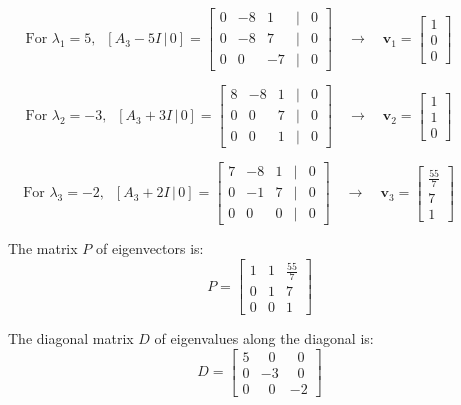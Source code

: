 \documentclass[a4paper,11pt,reqno]{amsart}
\numberwithin{equation}{section}
\begin{document}
\begin{enumerate}
\begin{center}
{{     \[ \text{For } \lambda_1 = 5, \;\;
     [A_3 - 5I\,|\,0] = \begin{bmatrix} 0 & -8 & 1 & | & 0 \\ 0 & -8 & 7 & | & 0 \\ 0 & 0 & -7 & | & 0 \end{bmatrix}
     \quad \to \quad
     \mathbf{v}_1 = \begin{bmatrix} 1 \\ 0 \\ 0 \end{bmatrix} \quad\quad\quad
     \]

   
     \[ \text{For } \lambda_2 = -3, \;\;
     [A_3 + 3I \,|\, 0] = \begin{bmatrix} 8 & -8 & 1 & | & 0 \\ 0 & 0 & 7 & | & 0 \\ 0 & 0 & 1 & | & 0 \end{bmatrix}
     \quad \to \quad
     \mathbf{v}_2 = \begin{bmatrix} 1 \\ 1 \\ 0 \end{bmatrix} \quad\quad\quad
     \]

     \[\text{For } \lambda_3 = -2, \;\;
     [A_3 + 2I \,|\, 0] = \begin{bmatrix} 7 & -8 & 1 & | & 0 \\ 0 & -1 & 7 & | & 0 \\ 0 & 0 & 0 & | & 0 \end{bmatrix}
     \quad \to \quad
     \mathbf{v}_3 = \begin{bmatrix} \frac{55}{7} \\ 7 \\ 1 \end{bmatrix} \quad\quad\quad
     \]

   The matrix \( P \) of eigenvectors is:
   \[
   P = \begin{bmatrix} 
   1 & 1 & \frac{55}{7} \\ 
   0 & 1 & 7 \\ 
   0 & 0 & 1
   \end{bmatrix}
   \]

   The diagonal matrix \( D \) of eigenvalues along the diagonal is:
   \[
   D = \begin{bmatrix} 
   5 & \;\;0 & \;\;0 \\
   0 & -3 & \;\;0 \\
   0 & \;\;0 & -2 
   \end{bmatrix}
   \]

}}
\end{center}
\end{enumerate}
\end{document}
